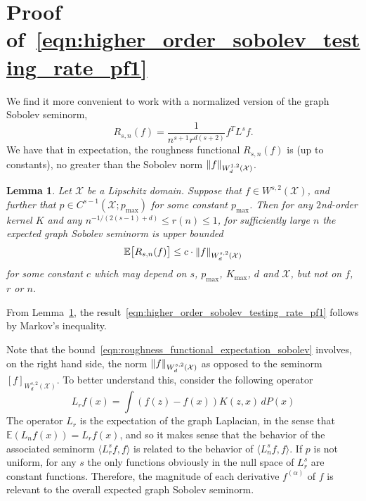 \documentclass{article}
\newcommand{\1}{\mathbf{1}}
\newcommand{\Xset}{\mathcal{X}}
\newcommand{\Ebb}{\mathbb{E}}
\newcommand{\dotp}[2]{\langle #1, #2 \rangle}
\theoremstyle{alden}
\theoremstyle{aldenthm}
\newtheorem{lemma}{Lemma}
\theoremstyle{definition}
\theoremstyle{remark}
\begin{document}
\section{Proof of~\eqref{eqn:higher_order_sobolev_testing_rate_pf1}}

We find it more convenient to work with a normalized version of the graph Sobolev seminorm, 
\begin{equation*}
R_{s,n}(f) = \frac{1}{n^{s + 1}r^{d(s + 2)}} f^T L^s f. 
\end{equation*}
We have that in expectation, the roughness functional $R_{s,n}(f)$ is (up to constants), no greater than the Sobolev norm $\norm{f}_{W_d^{1,2}(\mathcal{X})}$.
\begin{lemma}
	\label{lem:roughness_functional_expectation_sobolev}
	Let $\Xset$ be a Lipschitz domain. Suppose that $f \in W^{s,2}(\Xset)$, and further that $p \in C^{s-1}(\Xset;p_{\max})$ for some constant $p_{\max}$. Then for any $2$nd-order kernel $K$ and any $n^{-1/(2(s - 1) + d)} \leq r(n) \leq 1$, for sufficiently large $n$ the expected graph Sobolev seminorm is upper bounded
	\begin{equation}
	\label{eqn:roughness_functional_expectation_sobolev}
	\Ebb\bigl[R_{s,n}(f)\bigr] \leq c \cdot \norm{f}_{W_d^{s,2}(\Xset)}
	\end{equation}
	for some constant $c$ which may depend on $s$, $p_{\max}$, $K_{\max}$, $d$ and $\Xset$, but not on $f$, $r$ or $n$.
\end{lemma}
From Lemma~\ref{lem:roughness_functional_expectation_sobolev}, the result~\eqref{eqn:higher_order_sobolev_testing_rate_pf1} follows by Markov's inequality.

Note that the bound~\eqref{eqn:roughness_functional_expectation_sobolev} involves, on the right hand side, the norm $\norm{f}_{W_d^{s,2}(\Xset)}$ as opposed to the seminorm $[f]_{W_d^{s,2}(\Xset)}$. To better understand this, consider the following operator
\begin{equation*}
L_rf(x) = \int (f(z) - f(x))K(z,x) \,dP(x)
\end{equation*} 
The operator $L_r$ is the expectation of the graph Laplacian, in the sense that $\Ebb(L_nf(x)) = L_rf(x)$, and so it makes sense that the behavior of the associated seminorm $\dotp{L_r^sf}{f}$ is related to the behavior of $\dotp{L_n^sf}{f}$. If $p$ is not uniform, for any $s$ the only functions obviously in the null space of $L_r^s$ are constant functions. Therefore, the magnitude of each derivative $f^{(\alpha)}$ of $f$ is relevant to the overall expected graph Sobolev seminorm.
\end{document}
